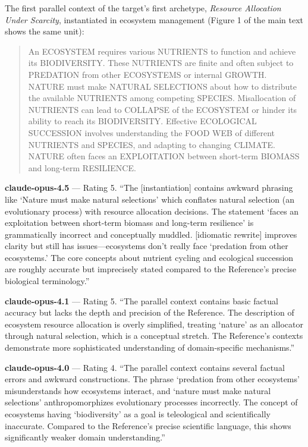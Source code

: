 \documentclass{article}
\begin{document}
The first parallel context of the target's first archetype, \emph{Resource Allocation Under Scarcity}, instantiated in ecosystem management (Figure 1 of the main text shows the same unit):

\begin{quote}
An ECOSYSTEM requires various NUTRIENTS to function and achieve its BIODIVERSITY. These NUTRIENTS are finite and often subject to PREDATION from other ECOSYSTEMS or internal GROWTH. NATURE must make NATURAL SELECTIONS about how to distribute the available NUTRIENTS among competing SPECIES. Misallocation of NUTRIENTS can lead to COLLAPSE of the ECOSYSTEM or hinder its ability to reach its BIODIVERSITY. Effective ECOLOGICAL SUCCESSION involves understanding the FOOD WEB of different NUTRIENTS and SPECIES, and adapting to changing CLIMATE. NATURE often faces an EXPLOITATION between short-term BIOMASS and long-term RESILIENCE.
\end{quote}

\textbf{claude-opus-4.5} --- Rating 5. ``The {[}instantiation{]} contains awkward phrasing like `Nature must make natural selections' which conflates natural selection (an evolutionary process) with resource allocation decisions. The statement `faces an exploitation between short-term biomass and long-term resilience' is grammatically incorrect and conceptually muddled. {[}idiomatic rewrite{]} improves clarity but still has issues---ecosystems don't really face `predation from other ecosystems.' The core concepts about nutrient cycling and ecological succession are roughly accurate but imprecisely stated compared to the Reference's precise biological terminology.''

\textbf{claude-opus-4.1} --- Rating 5. ``The parallel context contains basic factual accuracy but lacks the depth and precision of the Reference. The description of ecosystem resource allocation is overly simplified, treating `nature' as an allocator through natural selection, which is a conceptual stretch. The Reference's contexts demonstrate more sophisticated understanding of domain-specific mechanisms.''

\textbf{claude-opus-4.0} --- Rating 4. ``The parallel context contains several factual errors and awkward constructions. The phrase `predation from other ecosystems' misunderstands how ecosystems interact, and `nature must make natural selections' anthropomorphizes evolutionary processes incorrectly. The concept of ecosystems having `biodiversity' as a goal is teleological and scientifically inaccurate. Compared to the Reference's precise scientific language, this shows significantly weaker domain understanding.''
\end{document}
